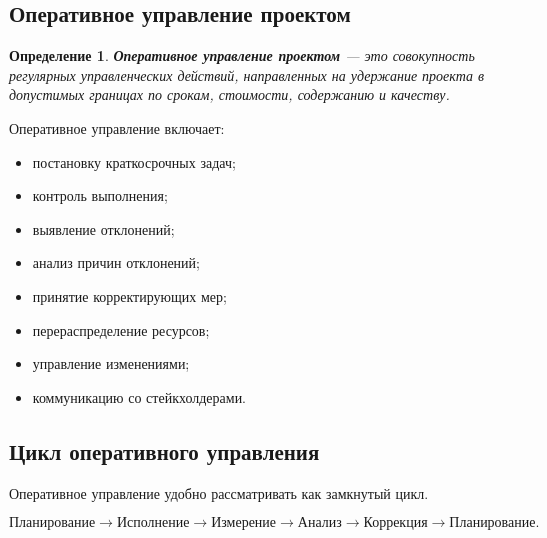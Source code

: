 \documentclass[12pt,a4paper]{article}
\newtheorem{definition}{Определение}
\begin{document}
\subsection{Оперативное управление проектом}

\begin{definition}
\textbf{Оперативное управление проектом} --- это совокупность регулярных управленческих действий, направленных на удержание проекта в допустимых границах по срокам, стоимости, содержанию и качеству.
\end{definition}

Оперативное управление включает:
\begin{itemize}
    \item постановку краткосрочных задач;
    \item контроль выполнения;
    \item выявление отклонений;
    \item анализ причин отклонений;
    \item принятие корректирующих мер;
    \item перераспределение ресурсов;
    \item управление изменениями;
    \item коммуникацию со стейкхолдерами.
\end{itemize}

\subsection{Цикл оперативного управления}

Оперативное управление удобно рассматривать как замкнутый цикл.

\[
\text{Планирование}
\rightarrow
\text{Исполнение}
\rightarrow
\text{Измерение}
\rightarrow
\text{Анализ}
\rightarrow
\text{Коррекция}
\rightarrow
\text{Планирование}.
\]

\begin{center}
\end{center}
\end{document}
